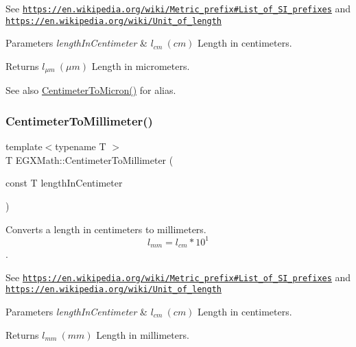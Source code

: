 See \href{https://en.wikipedia.org/wiki/Metric_prefix#List_of_SI_prefixes}{\tt https\+://en.\+wikipedia.\+org/wiki/\+Metric\+\_\+prefix\#\+List\+\_\+of\+\_\+\+S\+I\+\_\+prefixes} and \href{https://en.wikipedia.org/wiki/Unit_of_length}{\tt https\+://en.\+wikipedia.\+org/wiki/\+Unit\+\_\+of\+\_\+length} 
\begin{DoxyParams}{Parameters}
{\em length\+In\+Centimeter} & $ l_{cm}\ (cm)$ Length in centimeters. \\
\hline
\end{DoxyParams}
\begin{DoxyReturn}{Returns}
$ l_{\mu m}\ (\mu m)$ Length in micrometers. 
\end{DoxyReturn}
\begin{DoxySeeAlso}{See also}
\mbox{\hyperlink{group___e_g_x_math-_conversions-_length_conversions-_s_i-_centimeter-_non-_s_i_gaee509ac676e86ed54994792f82dab9f7}{Centimeter\+To\+Micron()}} for alias. 
\end{DoxySeeAlso}
\mbox{\label{group___e_g_x_math-_conversions-_length_conversions-_s_i-_centimeter-_s_i_ga3adaa50da05ec6ead83e93dbd9406ae0}} 
\subsubsection{\texorpdfstring{Centimeter\+To\+Millimeter()}{CentimeterToMillimeter()}}
{\footnotesize\ttfamily template$<$typename T $>$ \\
T E\+G\+X\+Math\+::\+Centimeter\+To\+Millimeter (\begin{DoxyParamCaption}\item[{const T}]{length\+In\+Centimeter }\end{DoxyParamCaption})}



Converts a length in centimeters to millimeters. \[ l_{mm}=l_{cm} * 10^{1} \]. 

See \href{https://en.wikipedia.org/wiki/Metric_prefix#List_of_SI_prefixes}{\tt https\+://en.\+wikipedia.\+org/wiki/\+Metric\+\_\+prefix\#\+List\+\_\+of\+\_\+\+S\+I\+\_\+prefixes} and \href{https://en.wikipedia.org/wiki/Unit_of_length}{\tt https\+://en.\+wikipedia.\+org/wiki/\+Unit\+\_\+of\+\_\+length} 
\begin{DoxyParams}{Parameters}
{\em length\+In\+Centimeter} & $ l_{cm}\ (cm)$ Length in centimeters. \\
\hline
\end{DoxyParams}
\begin{DoxyReturn}{Returns}
$ l_{mm}\ (mm)$ Length in millimeters. 
\end{DoxyReturn}
\mbox{\label{group___e_g_x_math-_conversions-_length_conversions-_s_i-_centimeter-_s_i_gacf80778df778af3266027dbe32bfd2d4}} 
